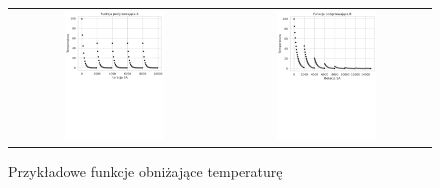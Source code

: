 \begin{figure}[h]
\begin{tabular}{ c c }
	\includegraphics[width=0.5\textwidth]{gfx/temp_heater_a.pdf} & \includegraphics[width=0.5\textwidth]{gfx/temp_heater_b.pdf}
\end{tabular}
	\caption{Przykładowe funkcje obniżające temperaturę}
	\label{example-cooling-functions}
\end{figure}
